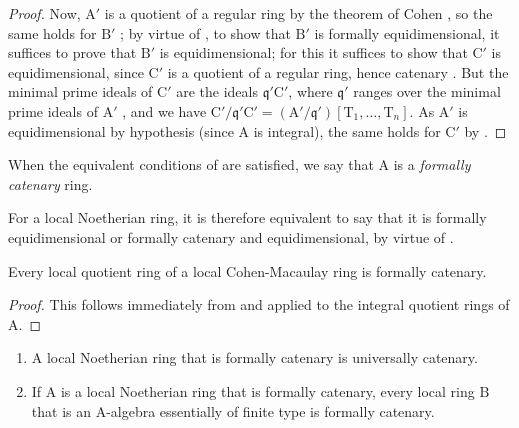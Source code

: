 \begin{proof}
Now, $\mathrm{A}'$ is a quotient of a regular ring by the theorem of Cohen , so the same holds for $\mathrm{B}'$ ; by virtue of , to show that $\mathrm{B}'$ is formally equidimensional, it suffices to prove that $\mathrm{B}'$ is equidimensional; for this it suffices to show that $\mathrm{C}'$ is equidimensional, since $\mathrm{C}'$ is a quotient of a regular ring, hence catenary .
But the minimal prime ideals of $\mathrm{C}'$ are the ideals $\mathfrak{q}'\mathrm{C}'$, where $\mathfrak{q}'$ ranges over the minimal prime ideals of $\mathrm{A}'$ , and we have $\mathrm{C}'/\mathfrak{q}'\mathrm{C}'=(\mathrm{A}'/\mathfrak{q}')[\mathrm{T}_1,\ldots,\mathrm{T}_n]$.
As $\mathrm{A}'$ is equidimensional by hypothesis (since $\mathrm{A}$ is integral), the same holds for $\mathrm{C}'$ by .
\end{proof}

\begin{definition}[7.1.9]
\label{IV.7.1.9}
When the equivalent conditions of  are satisfied, we say that $\mathrm{A}$ is a \emph{formally catenary} ring.
\end{definition}

For a local Noetherian ring, it is therefore equivalent to say that it is formally equidimensional or formally catenary and equidimensional, by virtue of .

\begin{proposition}[7.1.10]
\label{IV.7.1.10}
Every local quotient ring of a local Cohen-Macaulay ring is formally catenary.
\end{proposition}

\begin{proof}
This follows immediately from  and  applied to the integral quotient rings of $\mathrm{A}$.
\end{proof}

\begin{proposition}[7.1.11]
\label{IV.7.1.11}
\begin{enumerate}[label=\emph{\roman*)}]
  \item A local Noetherian ring that is formally catenary is universally catenary.
  \item If $\mathrm{A}$ is a local Noetherian ring that is formally catenary, every local ring $\mathrm{B}$ that is an A-algebra essentially of finite type is formally catenary.
\end{enumerate}
\end{proposition}

